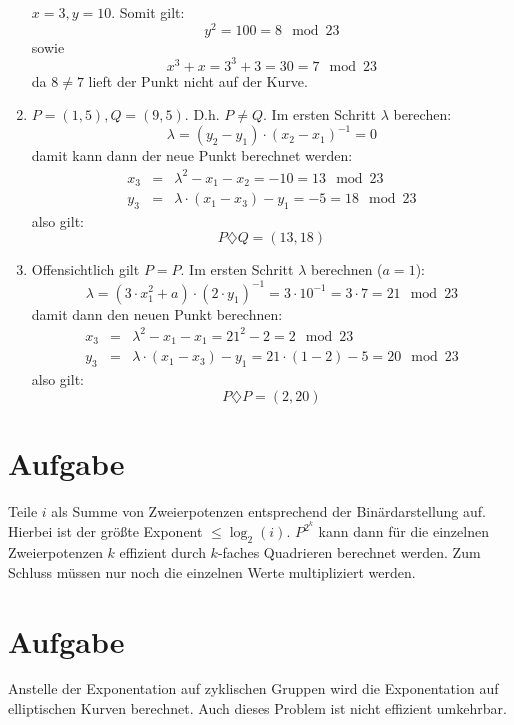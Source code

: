 \documentclass[DIN, pagenumber=false, fontsize=11pt, parskip=half]{scrartcl}
\begin{document}
\begin{enumerate}[label=\alph*)]
            $x=3, y=10$. Somit gilt:
            \begin{equation}
                y^2 = 100 = 8 \mod 23 
            \end{equation}
            sowie
            \begin{equation}
                x^3 + x = 3^3 + 3 = 30 = 7 \mod 23
            \end{equation}
            da $8 \neq 7$ lieft der Punkt nicht auf der Kurve.
        \item $P=(1, 5), Q=(9, 5)$. D.h. $P\neq Q$. Im ersten Schritt
            $\lambda$ berechen:
            \begin{equation}
                \lambda = (y_2 - y_1) \cdot (x_2 - x_1)^{-1} = 0
            \end{equation}
            damit kann dann der neue Punkt berechnet werden:
            \begin{eqnarray}
                x_3 &=& \lambda^2 - x_1 - x_2 = -10 = 13 \mod 23 \\
                y_3 &=& \lambda \cdot (x_1 - x_3) - y_1 = -5 = 18 \mod 23
            \end{eqnarray}
            also gilt:
            \begin{equation}
                P \diamondsuit Q = (13, 18)
            \end{equation}
        \item Offensichtlich gilt $P = P$. Im ersten Schritt $\lambda$ berechnen ($a=1$):
            \begin{equation}
                \lambda = (3 \cdot x_1^2 + a) \cdot (2 \cdot y_1)^{-1}
                    = 3 \cdot 10^{-1} = 3 \cdot 7 = 21 \mod 23 
            \end{equation}
            damit dann den neuen Punkt berechnen:
            \begin{eqnarray}
                x_3 &=& \lambda^2 - x_1 - x_1 = 21^2 - 2 = 2 \mod 23 \\
                y_3 &=& \lambda \cdot (x_1 - x_3) - y_1
                    = 21 \cdot (1 - 2) - 5 = 20 \mod 23
            \end{eqnarray}
            also gilt:
            \begin{equation}
                P \diamondsuit P = (2, 20)
            \end{equation}
    \end{enumerate}
    
    \section{Aufgabe}
    Teile $i$ als Summe von Zweierpotenzen entsprechend der Binärdarstellung auf. Hierbei ist der größte Exponent
    $\leq \log_2(i)$. $P^{2^k}$ kann dann für die einzelnen Zweierpotenzen $k$ effizient durch $k$-faches Quadrieren
    berechnet werden. Zum Schluss müssen nur noch die einzelnen Werte multipliziert werden.

    \section{Aufgabe}
    Anstelle der Exponentation auf zyklischen Gruppen wird die Exponentation auf elliptischen Kurven berechnet. Auch
    dieses Problem ist nicht effizient umkehrbar.
\end{document}
